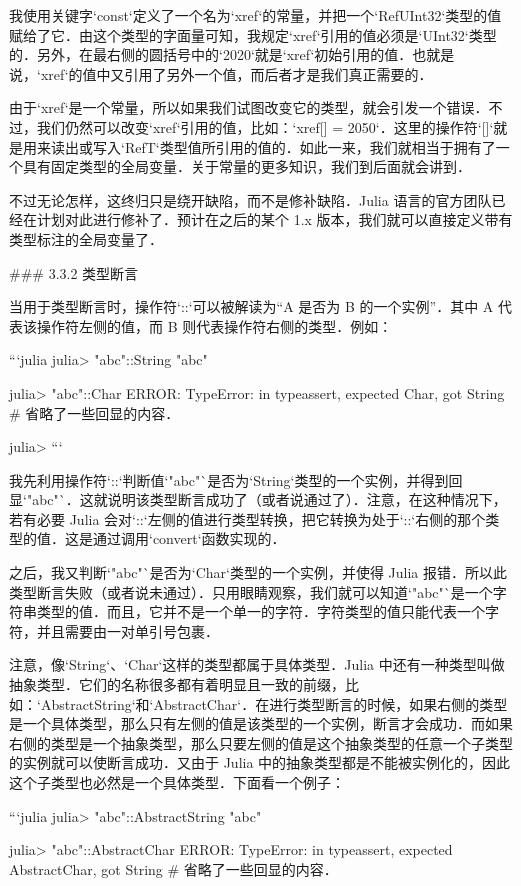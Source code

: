 我使用关键字`const`定义了一个名为`xref`的常量，并把一个`Ref{UInt32}`类型的值赋给了它．由这个类型的字面量可知，我规定`xref`引用的值必须是`UInt32`类型的．另外，在最右侧的圆括号中的`2020`就是`xref`初始引用的值．也就是说，`xref`的值中又引用了另外一个值，而后者才是我们真正需要的．

由于`xref`是一个常量，所以如果我们试图改变它的类型，就会引发一个错误．不过，我们仍然可以改变`xref`引用的值，比如：`xref[] = 2050`．这里的操作符`[]`就是用来读出或写入`Ref{T}`类型值所引用的值的．如此一来，我们就相当于拥有了一个具有固定类型的全局变量．关于常量的更多知识，我们到后面就会讲到．

不过无论怎样，这终归只是绕开缺陷，而不是修补缺陷．Julia 语言的官方团队已经在计划对此进行修补了．预计在之后的某个 1.x 版本，我们就可以直接定义带有类型标注的全局变量了．

### 3.3.2 类型断言

当用于类型断言时，操作符`::`可以被解读为“A 是否为 B 的一个实例”．其中 A 代表该操作符左侧的值，而 B 则代表操作符右侧的类型．例如：

```julia
julia> "abc"::String
"abc"

julia> "abc"::Char
ERROR: TypeError: in typeassert, expected Char, got String
# 省略了一些回显的内容．

julia> 
```

我先利用操作符`::`判断值`"abc"`是否为`String`类型的一个实例，并得到回显`"abc"`．这就说明该类型断言成功了（或者说通过了）．注意，在这种情况下，若有必要 Julia 会对`::`左侧的值进行类型转换，把它转换为处于`::`右侧的那个类型的值．这是通过调用`convert`函数实现的．

之后，我又判断`"abc"`是否为`Char`类型的一个实例，并使得 Julia 报错．所以此类型断言失败（或者说未通过）．只用眼睛观察，我们就可以知道`"abc"`是一个字符串类型的值．而且，它并不是一个单一的字符．字符类型的值只能代表一个字符，并且需要由一对单引号包裹．

注意，像`String`、`Char`这样的类型都属于具体类型．Julia 中还有一种类型叫做抽象类型．它们的名称很多都有着明显且一致的前缀，比如：`AbstractString`和`AbstractChar`．在进行类型断言的时候，如果右侧的类型是一个具体类型，那么只有左侧的值是该类型的一个实例，断言才会成功．而如果右侧的类型是一个抽象类型，那么只要左侧的值是这个抽象类型的任意一个子类型的实例就可以使断言成功．又由于 Julia 中的抽象类型都是不能被实例化的，因此这个子类型也必然是一个具体类型．下面看一个例子：

```julia
julia> "abc"::AbstractString
"abc"

julia> "abc"::AbstractChar
ERROR: TypeError: in typeassert, expected AbstractChar, got String
# 省略了一些回显的内容．

